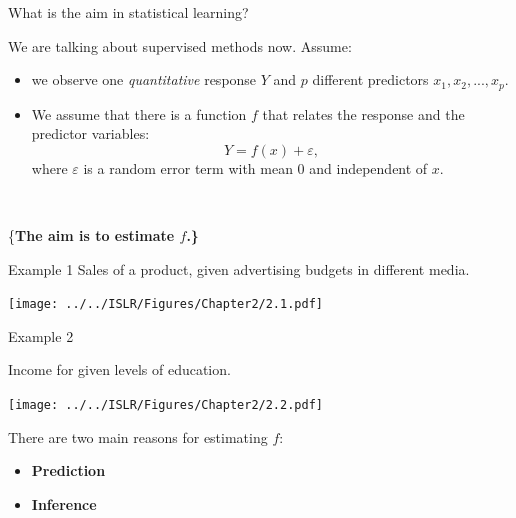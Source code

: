 \documentclass[
  ignorenonframetext,
]{beamer}
\providecommand{\tightlist}{%
  \setlength{\itemsep}{0pt}\setlength{\parskip}{0pt}}
\begin{document}
\begin{frame}
\begin{block}{What is the aim in statistical learning?}
\protect\hypertarget{what-is-the-aim-in-statistical-learning}{}
\vspace{3mm}

We are talking about supervised methods now. Assume:

\vspace{2mm}

\begin{itemize}
\tightlist
\item
  we observe one \emph{quantitative} response \(Y\) and \(p\) different
  predictors \(x_1, x_2,... , x_p\).
\end{itemize}

\vspace{1mm}

\begin{itemize}
\tightlist
\item
  We assume that there is a function \(f\) that relates the response and
  the predictor variables: \[ Y = f(x) + \varepsilon,\] where
  \(\varepsilon\) is a random error term with mean 0 and independent of
  \(x\).
\end{itemize}

\(~\)

\centering

\{\bf The aim is to estimate $f$.\}
\end{block}
\end{frame}

\begin{frame}{Example 1}
\protect\hypertarget{example-1}{}
Sales of a product, given advertising budgets in different media.

\texttt{[image: ../../ISLR/Figures/Chapter2/2.1.pdf]}
\end{frame}

\begin{frame}{Example 2}
\protect\hypertarget{example-2}{}
\vspace{4mm}

Income for given levels of education.

\texttt{[image: ../../ISLR/Figures/Chapter2/2.2.pdf]}
\end{frame}

\begin{frame}
There are two main reasons for estimating \(f\):

\begin{itemize}
\item
  \textbf{Prediction}
\item
  \textbf{Inference}
\end{itemize}
\end{frame}
\end{document}
